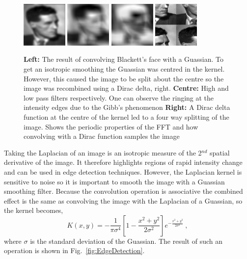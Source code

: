 \documentclass[10pt,a4paper]{article}
\begin{document}
\begin{figure}[h!]
\begin{center}
\includegraphics[width =0.2\textwidth]{BlackettGaussBlur.eps}
\includegraphics[width =0.2\textwidth]{BlackettHighPass.eps}
\includegraphics[width =0.2\textwidth]{BlackettLowPass.eps}
\includegraphics[width =0.2\textwidth]{BlackettSplitCenter.eps}
\caption{\textbf{Left: }The result of convolving Blackett's face with a Guassian. To get an isotropic smoothing the Guassian was centred in the kernel. However, this caused the image to be split about the centre so the image was recombined using a Dirac delta, right. \textbf{Centre: }High and low pass filters respectively. One can observe the ringing at the intensity edges due to the Gibb's phenomenon \textbf{Right: }A Dirac delta function at the centre of the kernel led to a four way splitting of the image. Shows the periodic properties of the FFT and how convolving with a Dirac function samples the image}
\label{fig:SimpleFilters}
\end{center}
\end{figure}

Taking the Laplacian of an image is an isotropic measure of the 2$^{nd}$ spatial derivative of the image. It therefore highlights regions of rapid intensity change and can be used in edge detection techniques.  However, the Laplacian kernel is sensitive to noise so it is important to smooth the image with a Guassian smoothing filter. Because the convolution operation is associative the combined effect is the same as convolving the image with the Laplacian of a Guassian, so the kernel becomes,
\begin{equation}
K(x,y) = -\frac{1}{\pi \sigma^{4}}\left[1-\frac{x^2+y^2}{2\sigma^2} \right]e^{-\frac{x^2+y^2}{2\sigma^2}}\: ,
\end{equation}
where $\sigma$ is the standard deviation of the Guassian. The result of such an operation is shown in Fig.~\ref{fig:EdgeDetection}.
\end{document}
